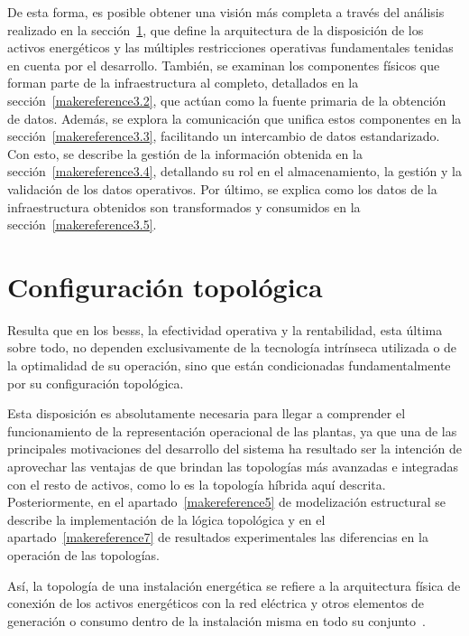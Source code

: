 De esta forma, es posible obtener una visión más completa a través del análisis realizado en la sección~\ref{makereference3.1}, que define la arquitectura de la disposición de los activos energéticos y las múltiples restricciones operativas fundamentales tenidas en cuenta por el desarrollo. También, se examinan los componentes físicos que forman parte de la infraestructura al completo, detallados en la sección~\ref{makereference3.2}, que actúan como la fuente primaria de la obtención de datos. Además, se explora la comunicación que unifica estos componentes en la sección~\ref{makereference3.3},  facilitando un intercambio de datos estandarizado. Con esto, se describe la gestión de la información obtenida en la sección~\ref{makereference3.4}, detallando su rol en el almacenamiento, la gestión y la validación de los datos operativos. Por último, se explica como los datos de la infraestructura obtenidos son transformados y consumidos en la sección~\ref{makereference3.5}.

\section{Configuración topológica}
\label{makereference3.1}

Resulta que en los \glspl{bess}, la efectividad operativa y la rentabilidad, esta última sobre todo, no dependen exclusivamente de la tecnología intrínseca utilizada o de la optimalidad de su operación, sino que están condicionadas fundamentalmente por su configuración topológica.

Esta disposición es absolutamente necesaria para llegar a comprender el funcionamiento de la representación operacional de las plantas, ya que una de las principales motivaciones del desarrollo del sistema ha resultado ser la intención de aprovechar las ventajas de que brindan las topologías más avanzadas e integradas con el resto de activos, como lo es la topología híbrida aquí descrita. Posteriormente, en el apartado~\ref{makereference5} de modelización estructural se describe la implementación de la lógica topológica y en el apartado~\ref{makereference7} de resultados experimentales las diferencias en la operación de las topologías.

Así, la topología de una instalación energética se refiere a la arquitectura física de conexión de los activos energéticos con la red eléctrica y otros elementos de generación o consumo dentro de la instalación misma en todo su conjunto~\cite{parlikar2019topology}.

